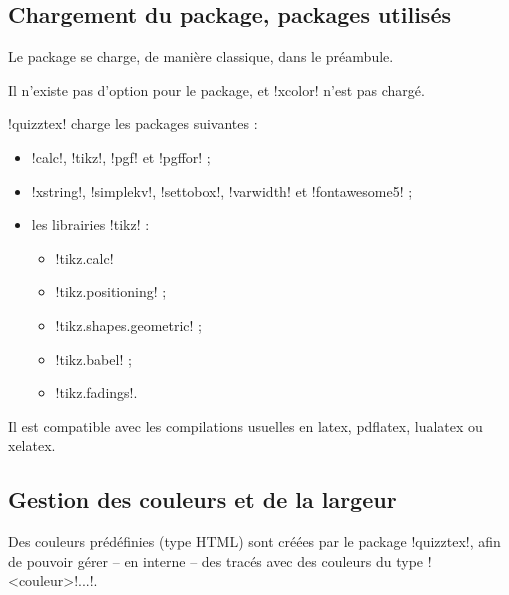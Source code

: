\documentclass[french,a4paper,11pt]{article}
\begin{document}
\subsection{Chargement du package, packages utilisés}

\begin{importantblock}
Le package se charge, de manière classique, dans le préambule.

Il n'existe pas d'option pour le package, et \packagetex!xcolor! n'est pas chargé.
\end{importantblock}


\begin{noteblock}
\packagetex!quizztex! charge les packages suivantes :

\begin{itemize}
	\item \packagetex!calc!, \packagetex!tikz!, \packagetex!pgf! et \packagetex!pgffor! ;
	\item \packagetex!xstring!, \packagetex!simplekv!, \packagetex!settobox!, \packagetex!varwidth! et \packagetex!fontawesome5! ;
	\item les librairies \packagetex!tikz! :
	\begin{itemize}
		\item \packagetex!tikz.calc!
		\item \packagetex!tikz.positioning! ;
		\item \packagetex!tikz.shapes.geometric! ;
		\item \packagetex!tikz.babel! ;
		\item \packagetex!tikz.fadings!.
	\end{itemize}
\end{itemize}

Il est compatible avec les compilations usuelles en \textsf{latex}, \textsf{pdflatex}, \textsf{lualatex} ou \textsf{xelatex}.
\end{noteblock}

\subsection{Gestion des couleurs et de la largeur}

\begin{tipblock}
Des couleurs prédéfinies (type \textsf{HTML}) sont créées par le package \packagetex!quizztex!, afin de pouvoir gérer -- en interne -- des tracés avec des couleurs du type \motcletex!<couleur>!...!.
\end{tipblock}
\end{document}
